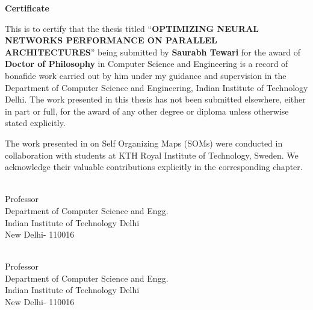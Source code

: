 {}
\begin{center}
	{\Huge \textbf{Certificate}} 
\end{center}

This is to certify that the thesis titled ``\textbf{OPTIMIZING NEURAL NETWORKS
	PERFORMANCE ON PARALLEL
	ARCHITECTURES}'' being submitted by  \textbf{Saurabh Tewari} for the award of \textbf{Doctor of Philosophy} in Computer Science and Engineering is a record of bonafide work carried out by him  under my guidance and supervision in the Department of Computer Science and Engineering, Indian Institute of Technology Delhi. The work presented in this thesis has not been submitted elsewhere, either in part or full, for the award of any other degree or diploma unless otherwise stated explicitly. 

The work presented in  on Self Organizing Maps (SOMs) were conducted in collaboration with students at KTH Royal Institute of Technology, Sweden. We acknowledge their valuable contributions explicitly in the corresponding chapter.

\vspace {10 pc}

\begin{multicols}{2}
 \\
Professor \\
Department of Computer Science and Engg. \\
Indian Institute of Technology Delhi \\
New Delhi- 110016 \\
\columnbreak

\\
Professor \\
Department of Computer Science and Engg.\\
Indian Institute of Technology Delhi \\
New Delhi- 110016
\end{multicols}